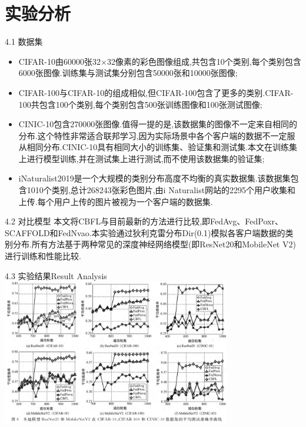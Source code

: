 \documentclass{sintefbeamer}
\theoremstyle{definition}
\begin{document}
\section{实验分析}

\begin{frame}{4.1 数据集}

	\begin{itemize}
\item[1)] CIFAR-10由60000张32×32像素的彩色图像组成,共包含10个类别,每个类别包含6000张图像.训练集与测试集分别包含50000张和10000张图像; 
\item[2)] CIFAR-100与CIFAR-10的组成相似,但CIFAR-100包含了更多的类别.CIFAR-100共包含100个类别,每个类别包含500张训练图像和100张测试图像; 
\item[3)] CINIC-10包含270000张图像.值得一提的是,该数据集的图像不一定来自相同的分布.这个特性非常适合联邦学习,因为实际场景中各个客户端的数据不一定服从相同分布.CINIC-10具有相同大小的训练集、验证集和测试集.本文在训练集上进行模型训练,并在测试集上进行测试,而不使用该数据集的验证集; 
\item[4)] iNaturalist2019是一个大规模的类别分布高度不均衡的真实数据集.该数据集包含1010个类别,总计268243张彩色图片,由i Naturalist网站的2295个用户收集和上传.每个用户上传的图片被视为一个客户端的数据集.
\end{itemize}
\end{frame}

\begin{frame}{4.2 对比模型}
	本文将CBFL与目前最新的方法进行比较,即FedAvg、FedPoxr、SCAFFOLD和FedNvao.本实验通过狄利克雷分布Dir(0.1)模拟各客户端数据的类别分布.所有方法基于两种常见的深度神经网络模型(即ResNet20和MobileNet V2)进行训练和性能比较.
\end{frame}


\begin{frame}{4.3 实验结果}{Result Analysis}
	\includegraphics[width=0.75\textwidth]{images/img_expr1}
\end{frame}
\end{document}
